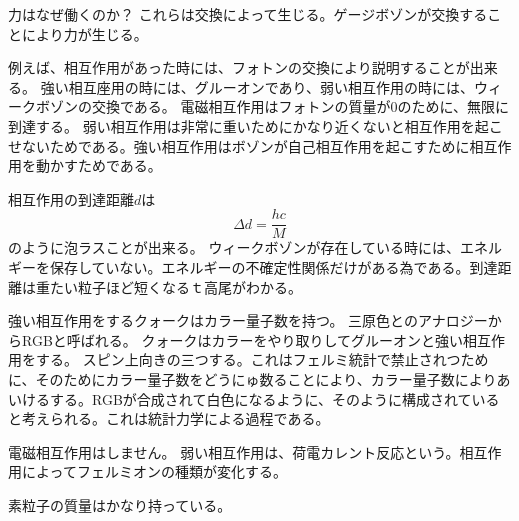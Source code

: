 \documentclass[titlepage]{ltjsarticle}
\begin{document}
力はなぜ働くのか？
これらは交換によって生じる。ゲージボゾンが交換することにより力が生じる。

例えば、相互作用があった時には、フォトンの交換により説明することが出来る。
強い相互座用の時には、グルーオンであり、弱い相互作用の時には、ウィークボゾンの交換である。
電磁相互作用はフォトンの質量が0のために、無限に到達する。
弱い相互作用は非常に重いためにかなり近くないと相互作用を起こせないためである。強い相互作用はボゾンが自己相互作用を起こすために相互作用を動かすためである。

相互作用の到達距離\(d\)は
\begin{equation}
  \Delta d =  \frac{hc}{M}
\end{equation}
のように泡ラスことが出来る。
ウィークボゾンが存在している時には、エネルギーを保存していない。エネルギーの不確定性関係だけがある為である。到達距離は重たい粒子ほど短くなるｔ高尾がわかる。


強い相互作用をするクォークはカラー量子数を持つ。
三原色とのアナロジーからRGBと呼ばれる。
クォークはカラーをやり取りしてグルーオンと強い相互作用をする。
スピン上向きの三つする。これはフェルミ統計で禁止されつために、そのためにカラー量子数をどうにゅ数ることにより、カラー量子数によりあいけるする。RGBが合成されて白色になるように、そのように構成されていると考えられる。これは統計力学による過程である。

電磁相互作用はしません。
弱い相互作用は、荷電カレント反応という。相互作用によってフェルミオンの種類が変化する。

素粒子の質量はかなり持っている。
\end{document}
